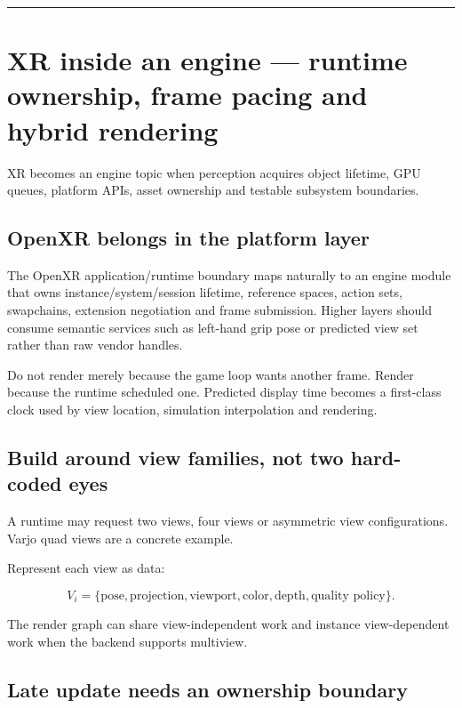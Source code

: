 \begin{center}\rule{0.5\linewidth}{0.5pt}\end{center}

\section{XR inside an engine --- runtime ownership, frame pacing and hybrid rendering}\label{xr-inside-an-engine-runtime-ownership-frame-pacing-and-hybrid-rendering}

XR becomes an engine topic when perception acquires object lifetime, GPU queues, platform APIs, asset ownership and testable subsystem boundaries.

\subsection{OpenXR belongs in the platform layer}\label{openxr-belongs-in-the-platform-layer}

The OpenXR application/runtime boundary maps naturally to an engine module that owns instance/system/session lifetime, reference spaces, action sets, swapchains, extension negotiation and frame submission. Higher layers should consume semantic services such as left-hand grip pose or predicted view set rather than raw vendor handles.

Do not render merely because the game loop wants another frame. Render because the runtime scheduled one. Predicted display time becomes a first-class clock used by view location, simulation interpolation and rendering.

\subsection{Build around view families, not two hard-coded eyes}\label{build-around-view-families-not-two-hard-coded-eyes}

A runtime may request two views, four views or asymmetric view configurations. Varjo quad views are a concrete example.

Represent each view as data:

\[
V_i=\{\text{pose},\text{projection},\text{viewport},
\text{color},\text{depth},\text{quality policy}\}.
\]

The render graph can share view-independent work and instance view-dependent work when the backend supports multiview.

\subsection{Late update needs an ownership boundary}\label{late-update-needs-an-ownership-boundary}

